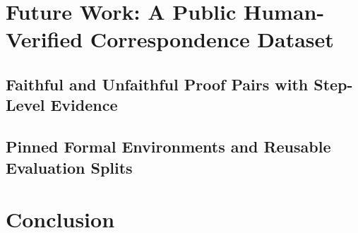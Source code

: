 \documentclass[sigconf,nonacm]{acmart}
\newcommand{\draftspace}{\mbox{}\par\smallskip}
\begin{document}
\section{Future Work: A Public Human-Verified Correspondence Dataset}
\subsection{Faithful and Unfaithful Proof Pairs with Step-Level Evidence}
\draftspace
\subsection{Pinned Formal Environments and Reusable Evaluation Splits}
\draftspace

\section{Conclusion}
\draftspace


\nocite{proofnet,herald,pistis,faithform,lora,qwen,navierstokes,xena,george}

\end{document}
